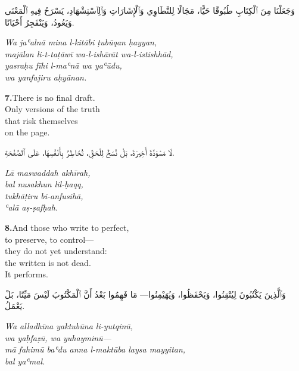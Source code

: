 \documentclass[11pt,a4paper,twoside]{book}
\begin{document}
\begin{flushright}
{\arabicfont وَجَعَلْنَا مِنَ ٱلْكِتَابِ طُبُوقًا حَيًّا،
مَجَالًا لِلتَّطَاوِي وَٱلْإِشَارَاتِ وَٱلِٱسْتِشْهَادِ،
يَسْرَحُ فِيهِ ٱلْمَعْنَى وَيَعُودُ،
وَيَنْفَجِرُ أَحْيَانًا.}
\end{flushright}

{\small\color{sage}\itshape Wa jaʿalnā mina l-kitābi ṭubūqan ḥayyan, \\
majālan li-t-taṭāwī wa-l-ishārāt wa-l-istishhād, \\
yasraḥu fīhi l-maʿnā wa yaʿūdu, \\
wa yanfajiru aḥyānan.}

\vspace{1.2em}
{\color{indigo}\bfseries 7.}\quad There is no final draft. \\
Only versions of the truth \\
that risk themselves \\
on the page.

\begin{flushright}
{\arabicfont لَا مَسْوَدَّةَ أَخِيرَةَ،
بَلْ نُسَخٌ لِلْحَقِّ،
تُخَاطِرُ بِأَنْفُسِهَا،
عَلَى ٱلصَّفْحَةِ.}
\end{flushright}

{\small\color{sage}\itshape Lā maswaddah akhīrah, \\
bal nusakhun lil-ḥaqq, \\
tukhāṭiru bi-anfusihā, \\
ʿalā aṣ-ṣafḥah.}

\vspace{1.2em}
{\color{indigo}\bfseries 8.}\quad And those who write to perfect, \\
to preserve, to control— \\
they do not yet understand: \\
the written is not dead. \\
It performs.

\begin{flushright}
{\arabicfont وَٱلَّذِينَ يَكْتُبُونَ لِيُتْقِنُوا،
وَيَحْفَظُوا، وَيُهَيْمِنُوا—
مَا فَهِمُوا بَعْدُ أَنَّ ٱلْمَكْتُوبَ لَيْسَ مَيِّتًا،
بَلْ يَعْمَلُ.}
\end{flushright}

{\small\color{sage}\itshape Wa alladhīna yaktubūna li-yutqinū, \\
wa yaḥfaẓū, wa yuhayminū— \\
mā fahimū baʿdu anna l-maktūba laysa mayyitan, \\
bal yaʿmal.}
\end{document}
